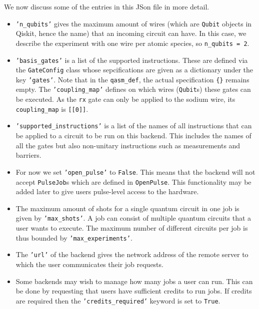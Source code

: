 \documentclass[a4paper, 10pt]{article}
\newcommand{\co}[1]{\texttt{#1}}
\begin{document}
\noindent We now discuss some of the entries in this JSon file in more detail.
\begin{itemize}
    \item \texttt{'n\_qubits'} gives the maximum amount of wires (which are \co{Qubit} objects in Qiskit, hence the name) that an incoming circuit can have. In this case, we describe the experiment with one wire per atomic species, so \co{n\_qubits = 2}. 
    
    \item \co{'basis\_gates'} is a list of the supported instructions. These are defined via the \co{GateConfig} class whose sepcifications are given as a dictionary under the key \co{'gates'}. Note that in the \co{qasm\_def}, the actual specification \co{\{\}} remains empty. The \co{'coupling\_map'} defines on which wires (\co{Qubit}s) these gates can be executed. As the \co{rx} gate can only be applied to the sodium wire, its \co{coupling\_map} is \co{[[0]]}.
    
    \item \co{'supported\_instructions'} is a list of the names of all instructions that can be applied to a circuit to be run on this backend. This includes the names of all the gates but also non-unitary instructions such as measurements and barriers. 
    
    \item For now we set \co{'open\_pulse'} to \co{False}. This means that the backend will not accept \co{PulseJob}s which are defined in \co{OpenPulse}. This functionality may be added later to give users pulse-level access to the hardware. 
    
    \item The maximum amount of shots for a single quantum circuit in one job is given by \co{'max\_shots'}. A job can consist of multiple quantum circuits that a user wants to execute. The maximum number of different circuits per job is thus bounded by \co{'max\_experiments'}. 
    
    \item The \co{'url'} of the backend gives the network address of the remote server to which the user communicates their job requests. 
    
    \item Some backends may wish to manage how many jobs a user can run. This can be done by requesting that users have sufficient credits to run jobs. If credits are required then the \co{'credits\_required'} keyword is set to \co{True}. 

\end{itemize}
\end{document}
